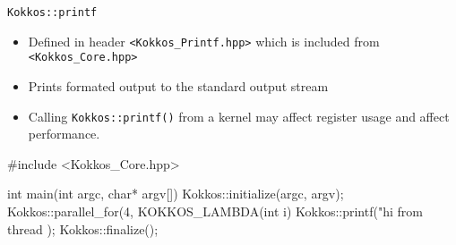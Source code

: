 \begin{frame}[fragile]{\texttt{Kokkos::printf}}
\begin{itemize}
\item Defined in header \texttt{<Kokkos\_Printf.hpp>} which is included from
      \texttt{<Kokkos\_Core.hpp>}
\item Prints formated output to the standard output stream
\item Calling \texttt{Kokkos::printf()} from a kernel may affect register usage
      and affect performance.
\end{itemize}
\begin{code}[keywords={printf}]
#include <Kokkos_Core.hpp>

int main(int argc, char* argv[]) {
    Kokkos::initialize(argc, argv);
    Kokkos::parallel_for(4, KOKKOS_LAMBDA(int i) {
        Kokkos::printf("hi from thread %
    });
    Kokkos::finalize();
}
\end{code}
\end{frame}
